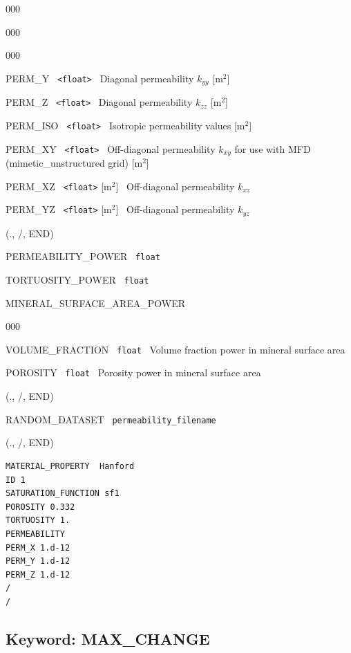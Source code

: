 \documentclass[12pt]{article}
\begin{document}
\begin{deflist}{000}
\begin{deflist}{000}
\begin{deflist}{000}
\item[PERM\_Y] \ {\tt <float>} \ Diagonal permeability $k_{yy}$ [m$^2$]
\item[PERM\_Z] \ {\tt <float>} \ Diagonal permeability $k_{zz}$ [m$^2$]
\item[PERM\_ISO] \ {\tt <float>} \ Isotropic permeability values [m$^2$]
\item[PERM\_XY] \ {\tt <float>} \ Off-diagonal permeability $k_{xy}$ for use with MFD (mimetic\_unstructured grid) [m$^2$]
\item[PERM\_XZ] \ {\tt <float>} [m$^2$] \ Off-diagonal permeability $k_{xz}$
\item[PERM\_YZ] \ {\tt <float>} [m$^2$] \ Off-diagonal permeability $k_{yz}$
\end{deflist}
\item[(., /, END)]
\item[PERMEABILITY\_POWER] \ {\tt float}
\item[TORTUOSITY\_POWER] \ {\tt float}
\item[MINERAL\_SURFACE\_AREA\_POWER] ~
\begin{deflist}{000}
\item[VOLUME\_FRACTION] \ {\tt float} \ Volume fraction power in mineral surface area
\item[POROSITY] \ {\tt float} \ Porosity power in mineral surface area
\end{deflist}
\item[(., /, END)]
\item[RANDOM\_DATASET] \ {\tt permeability\_filename}
\end{deflist}
\item[(., /, END)]
\end{deflist}


\begin{verbatim}
MATERIAL_PROPERTY  Hanford
ID 1
SATURATION_FUNCTION sf1
POROSITY 0.332
TORTUOSITY 1.
PERMEABILITY
PERM_X 1.d-12
PERM_Y 1.d-12
PERM_Z 1.d-12
/
/
\end{verbatim}


\newpage
\protect\hypertarget{target_max}{}

\subsection{Keyword: MAX\_CHANGE}
\end{document}
